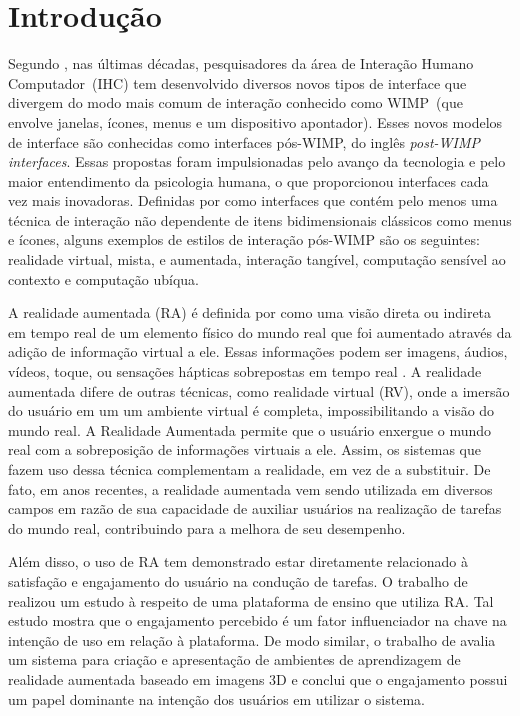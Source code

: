 \documentclass[../main.tex]{subfiles}
\begin{document}
\chapter{Introdução}\label{cap:introducao}


Segundo , nas últimas décadas, pesquisadores da área de Interação Humano Computador~(IHC) tem desenvolvido diversos novos tipos de interface que divergem do modo mais comum de interação conhecido como WIMP~(que envolve janelas, ícones, menus e um dispositivo apontador). Esses novos modelos de interface são conhecidas como interfaces pós-WIMP, do inglês \emph{post-WIMP interfaces}. Essas propostas foram impulsionadas pelo avanço da tecnologia  e pelo maior entendimento da psicologia humana, o que proporcionou interfaces cada vez mais inovadoras. Definidas por  como interfaces que contém pelo menos uma técnica de interação não dependente de itens bidimensionais clássicos como menus e ícones, alguns exemplos de estilos de interação pós-WIMP são os seguintes: realidade virtual, mista, e aumentada, interação tangível, computação sensível ao contexto e computação ubíqua.

A realidade aumentada (RA) é definida por  como uma visão direta ou indireta em tempo real de um elemento físico do mundo real que foi aumentado através da adição de informação virtual a ele. Essas informações podem ser imagens, áudios, vídeos, toque, ou sensações hápticas sobrepostas em tempo real \cite{buchmann2004fingartips}. A realidade aumentada difere de outras técnicas, como realidade virtual (RV), onde a imersão do usuário em um um ambiente virtual é completa, impossibilitando a visão do mundo real. A Realidade Aumentada permite que o usuário enxergue o mundo real com a sobreposição de informações virtuais a ele. Assim, os sistemas que fazem uso dessa técnica complementam a realidade, em vez de a substituir. De fato, em anos recentes, a realidade aumentada vem sendo utilizada em diversos campos em razão de sua capacidade de auxiliar usuários na realização de tarefas do mundo real, contribuindo para a melhora de seu desempenho. 



Além disso, o uso de RA tem demonstrado estar diretamente relacionado à satisfação e engajamento do usuário na condução de tarefas. O trabalho de  realizou um estudo à respeito de uma plataforma de ensino que utiliza RA. Tal estudo mostra que o engajamento percebido é um fator influenciador na chave na intenção de uso em relação à plataforma. De modo similar, o trabalho de  avalia um sistema para criação e apresentação de ambientes de aprendizagem de realidade aumentada baseado em imagens 3D e conclui que o engajamento possui um papel dominante na intenção dos usuários em utilizar o sistema.
\end{document}
